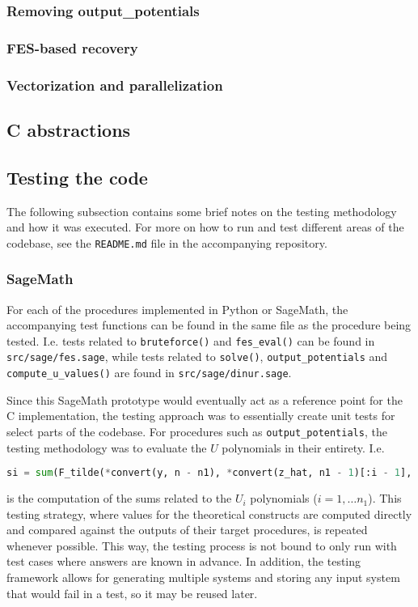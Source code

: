 \subsubsection{Removing output\_potentials}

\subsubsection{FES-based recovery}

\subsubsection{Vectorization and parallelization}

\subsection{C abstractions} \label{sec:impl:c_abstr}

\subsection{Testing the code}
The following subsection contains some brief notes on the testing methodology and how it was executed. For more on how to run and test different areas of the codebase, see the \texttt{README.md} file in the accompanying repository.

\subsubsection{SageMath}

For each of the procedures implemented in Python or SageMath, the accompanying test functions can be found in the same file as the procedure being tested. I.e. tests related to \texttt{bruteforce()} and \texttt{fes\_eval()} can be found in \texttt{src/sage/fes.sage}, while tests related to \texttt{solve()}, \texttt{output\_potentials} and \texttt{compute\_u\_values()} are found in \texttt{src/sage/dinur.sage}.

Since this SageMath prototype would eventually act as a reference point for the C implementation, the testing approach was to essentially create unit tests for select parts of the codebase. For procedures such as \texttt{output\_potentials}, the testing methodology was to evaluate the $U$ polynomials in their entirety. I.e.
\begin{lstlisting}[language=Python,style=mystyle]
si = sum(F_tilde(*convert(y, n - n1), *convert(z_hat, n1 - 1)[:i - 1], 0, *convert(z_hat, n1 - 1)[i - 1:]) for z_hat in range(2^(n1 - 1)))
\end{lstlisting}
is the computation of the sums related to the $U_i$ polynomials ($i = 1, \dots n_1$). This testing strategy, where values for the theoretical constructs are computed directly and compared against the outputs of their target procedures, is repeated whenever possible. This way, the testing process is not bound to only run with test cases where answers are known in advance. In addition, the testing framework allows for generating multiple systems and storing any input system that would fail in a test, so it may be reused later.

